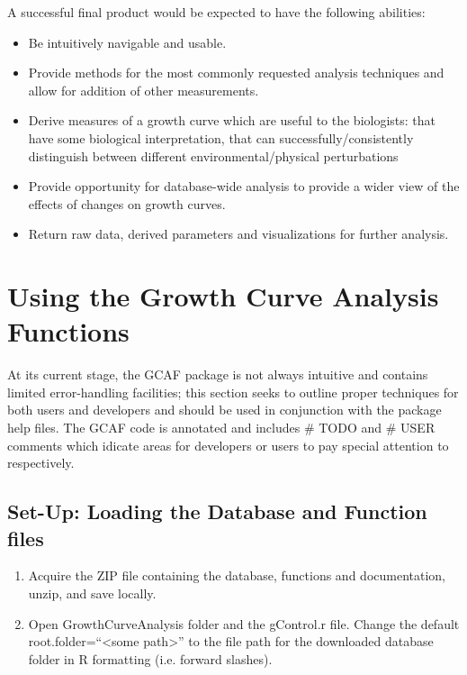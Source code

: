 \documentclass[11pt]{article}
\newcommand{\inlex}[1]{\ttfamily\small{#1}\rmfamily}
\begin{document}
\begin{spacing}{.1}
A successful final product would be expected to have the following abilities:
\begin{itemize}
\item Be intuitively navigable and usable.
\item Provide methods for the most commonly requested analysis techniques and allow for addition of other measurements.
\item Derive measures of a growth curve which are useful to the biologists: that have some biological interpretation, that can successfully/consistently distinguish between different environmental/physical perturbations
\item Provide opportunity for database-wide analysis to provide a wider view of the effects of changes on growth curves.
\item Return raw data, derived parameters and visualizations for further analysis.
\end{itemize}


\section{Using the Growth Curve Analysis Functions}
At its current stage, the GCAF package is not always intuitive and contains limited error-handling facilities; this section seeks to outline proper techniques for both users and developers and should be used in conjunction with the package help files. The GCAF code is annotated and includes \inlex{\# TODO} and \inlex{\# USER} comments which idicate areas for developers or users to pay special attention to respectively. 


\subsection{Set-Up: Loading the Database and Function files}
\begin{enumerate}
\item Acquire the ZIP file containing the database, functions and documentation, unzip, and save locally.
\item Open GrowthCurveAnalysis folder and the \inlex{gControl.r} file. Change the default \inlex{root.folder=``<some path>''} to the file path for the downloaded database folder in R formatting (i.e. forward slashes).


\end{enumerate}
\end{spacing}
\end{document}
